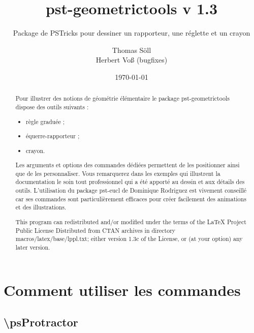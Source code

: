 \documentclass[fontsize=11pt,english,BCOR=10mm,DIV=12,bibliography=totoc,parskip=false,headings=small,
    headinclude=false,footinclude=false,oneside]{pst-doc}
\begin{document}
\title{pst-geometrictools v 1.3}
\subtitle{Package de PSTricks pour dessiner un rapporteur, une r\'{e}glette et un crayon}
\author{Thomas Söll\\Herbert Voß (bugfixes)}
\date{\today}

\settitle

\tableofcontents

\begin{abstract}
Pour illustrer des notions de g\'{e}om\'{e}trie \'{e}l\'{e}mentaire le package pst-geometrictools dispose des outils suivants :
\begin{itemize}
  \item r\`{e}gle gradu\'{e}e ;
  \item \'{e}querre-rapporteur ;
  \item crayon.
\end{itemize}
Les arguments et options des commandes d\'{e}di\'{e}es permettent de les positionner ainsi que de les personnaliser. Vous remarquerez dans les exemples qui illustrent la documentation le soin tout professionnel qui a \'{e}t\'{e} apport\'{e} au dessin et aux d\'{e}tails des outils. L'utilisation du package pst-eucl de Dominique Rodriguez est vivement conseill\'{e} car ses commandes sont particuli\`{e}rement efficaces pour cr\'{e}er facilement des animations et des illustrations.

\bigskip
This program can redistributed and/or modified under the terms of the LaTeX Project Public License Distributed from CTAN archives in directory macros/latex/base/lppl.txt; either version 1.3c of the License, or (at your option) any later version.
\end{abstract}


\clearpage


\section{Comment utiliser les commandes}

\subsection{\textbackslash psProtractor}

\begin{BDef}
\OptArgs{}%
\\
\OptArgs{}
\end{BDef}
\end{document}
